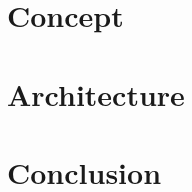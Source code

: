 



\begin{appendices}


\chapter{Concept}
\label{app:concept}

\pagebreak
\FloatBarrier

\chapter{Architecture}
\label{app:architecture}

\pagebreak
\FloatBarrier

\chapter{Conclusion}
\label{app:conclusion}

\pagebreak
\FloatBarrier

\end{appendices}


